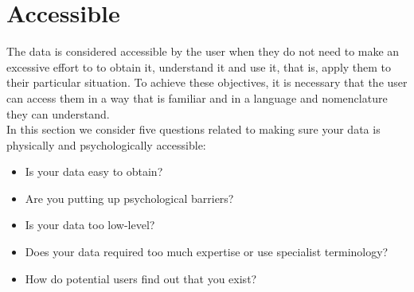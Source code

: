\section{Accessible}

The data is considered accessible by the user when they do not need to make an excessive effort to
to obtain it, understand it and use it, that is, apply them to their particular situation. To achieve these objectives,
it is necessary that the user can access them in a way that is familiar and in a language and nomenclature
they can understand.\\ 

In this section we consider five questions related to making sure your data is physically and psychologically accessible:

\begin{itemize}
    \item Is your data easy to obtain?
    \item Are you putting up psychological barriers?
    \item Is your data too low-level?
    \item Does your data required too much expertise or use specialist terminology?
    \item How do potential users find out that you exist?
\end{itemize}






